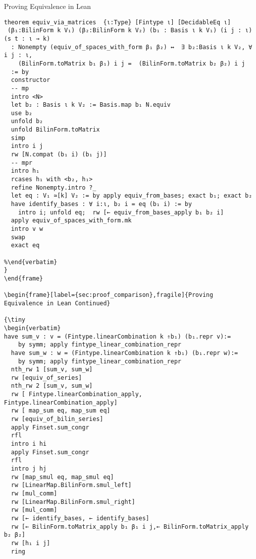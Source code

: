 \documentclass[svgnames]{beamer}
\begin{document}



\begin{frame}[label={sec:proof_comparison},fragile]{Proving Equivalence in Lean}

{\tiny
\begin{verbatim}
theorem equiv_via_matrices  {ι:Type} [Fintype ι] [DecidableEq ι]
 (β₁:BilinForm k V₁) (β₂:BilinForm k V₂) (b₁ : Basis ι k V₁) (i j : ι) (s t : ι → k)
  : Nonempty (equiv_of_spaces_with_form β₁ β₂) ↔  ∃ b₂:Basis ι k V₂, ∀ i j : ι,
    (BilinForm.toMatrix b₁ β₁) i j =  (BilinForm.toMatrix b₂ β₂) i j
  := by
  constructor
  -- mp
  intro <N>
  let b₂ : Basis ι k V₂ := Basis.map b₁ N.equiv
  use b₂
  unfold b₂
  unfold BilinForm.toMatrix
  simp
  intro i j
  rw [N.compat (b₁ i) (b₁ j)]
  -- mpr
  intro h₁
  rcases h₁ with <b₂, h₁>
  refine Nonempty.intro ?_
  let eq : V₁ ≃[k] V₂ := by apply equiv_from_bases; exact b₁; exact b₂
  have identify_bases : ∀ i:ι, b₂ i = eq (b₁ i) := by
    intro i; unfold eq;  rw [← equiv_from_bases_apply b₁ b₂ i]
  apply equiv_of_spaces_with_form.mk
  intro v w
  swap
  exact eq
  
%\end{verbatim}
}
\end{frame}

\begin{frame}[label={sec:proof_comparison},fragile]{Proving Equivalence in Lean Continued}

{\tiny
\begin{verbatim}
have sum_v : v = (Fintype.linearCombination k ⇑b₁) (b₁.repr v):=
    by symm; apply fintype_linear_combination_repr
  have sum_w : w = (Fintype.linearCombination k ⇑b₁) (b₁.repr w):=
    by symm; apply fintype_linear_combination_repr
  nth_rw 1 [sum_v, sum_w]
  rw [equiv_of_series]
  nth_rw 2 [sum_v, sum_w]
  rw [ Fintype.linearCombination_apply, Fintype.linearCombination_apply]
  rw [ map_sum eq, map_sum eq]
  rw [equiv_of_bilin_series]
  apply Finset.sum_congr
  rfl
  intro i hi
  apply Finset.sum_congr
  rfl
  intro j hj
  rw [map_smul eq, map_smul eq]
  rw [LinearMap.BilinForm.smul_left]
  rw [mul_comm]
  rw [LinearMap.BilinForm.smul_right]
  rw [mul_comm]
  rw [← identify_bases, ← identify_bases]
  rw [← BilinForm.toMatrix_apply b₁ β₁ i j,← BilinForm.toMatrix_apply b₂ β₂]
  rw [h₁ i j]
  ring
\end{verbatim}
}
\end{frame}
\end{document}
